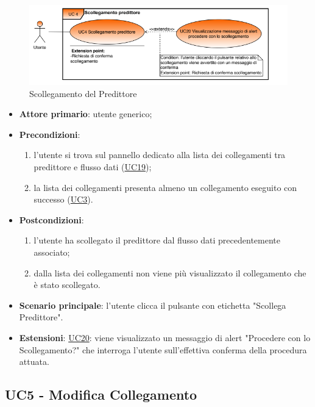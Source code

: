 		\begin{figure}[H]
		\centering
		\includegraphics[scale=0.80]{../Analisi_dei_requisiti/img/Diagrammi_UML/UC4_Scollegamento_predittore.png}
		\caption{Scollegamento del Predittore}
		\end{figure}	

		\begin{itemize}
			\item\textbf{Attore primario}: utente generico;
			\item\textbf{Precondizioni}:
				\begin{enumerate}
					\item l'utente si trova sul pannello dedicato alla lista dei collegamenti tra predittore e flusso dati (\hyperref[par:UC19]{UC19});
					\item la lista dei collegamenti presenta almeno un collegamento eseguito con successo (\hyperref[par:UC3]{UC3}).
				\end{enumerate}
			\item\textbf{Postcondizioni}:
				\begin{enumerate}
					\item l’utente ha scollegato il predittore dal flusso dati precedentemente associato;
					\item dalla lista dei collegamenti non viene più visualizzato il collegamento che è stato scollegato.
				\end{enumerate}
			\item\textbf{Scenario principale}: l'utente clicca il pulsante con etichetta "Scollega Predittore".
			\item\textbf{Estensioni}: \hyperref[par:UC20]{UC20}: viene visualizzato un messaggio di alert "Procedere con lo Scollegamento?" che interroga l'utente sull'effettiva conferma della procedura attuata.
		\end{itemize}	


	\label{par:UC5}
	\subsection{UC5 - Modifica Collegamento}

